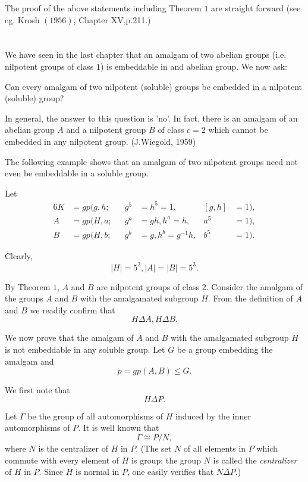 The proof of the above statements including Theorem $1$ are straight
forward (see eg. Krosh $(1956)$, Chapter XV,p.211.) 

\section{} %

We have seen in the last chapter that an amalgam of two abelian groups
(i.e. nilpotent groups of class $1$) is embeddable in and abelian
group. We now ask: 

Can every amalgam of two nilpotent (soluble) groups be embedded in a
nilpotent (soluble) group? 

In general, the answer to this question is 'no'. In fact, there is an
amalgam of an abelian group $A$ and a nilpotent group $B$ of class
$c=2$ which cannot be embedded in any nilpotent group. (J.Wiegold,
1959) 

The following example shows that an amalgam of two nilpotent groups
need not even be embeddable in a soluble group. 

Let
\begin{alignat*}{6}
  K&= gp(g,h;\quad  &g^5&=h^5=1,\quad  &[g,h]&=1),\\
  A &=gp(H,a;       &g^a&=gh, h^a=h, &a^5&=1),\\
  B&= gp(H,b; &g^b&=g, h^b=g^{-1}h, &b^5&=1).
\end{alignat*}

Clearly,
$$
|H|=5^2,|A|=|B|=5^3.
$$

By Theorem $1$, $A$ and $B$ are nilpotent groups of class
$2$. Consider the amalgam of the groups $A$ and $B$ with the
amalgamated subgroup $H$. From the definition of $A$ and $B$ we
readily confirm that 
$$
H \Delta A, H \Delta B.
$$

We now prove that the amalgam of $A$ and $B$ with the amalgamated
subgroup $H$ is not embeddable in any soluble group. Let $G$ be a
group embedding the amalgam and 
$$
p=gp(A,B)\leq G.
$$

We first note that
$$
H \Delta P.
$$

Let $\Gamma$ be the group of all automorphisms of $H$ induced by the
inner automorphisms of $P$. It is well known that 
$$
\Gamma \cong P/N,
$$
where $N$ is the centralizer of $H$ in $P$. (The set $N$ of all
elements in $P$ which commute with every element of $H$ is group; the
group $N$ is called the \textit{centralizer} of $H$ in $P$. Since $H$
is normal in $P$, one easily verifies that $N \Delta P$.) 

